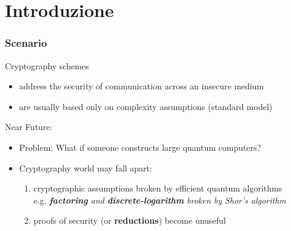 \section{Introduzione}

\begin{frame}
 \frametitle{Scenario}
 \begin{center}
 \end{center}

 \begin{block}{Cryptography schemes}
 \begin{itemize}
  \item address the security of communication across an insecure medium
  \item are usually based only on complexity assumptions (standard model)
 \end{itemize}
 \end{block}
 
 \begin{block}{Near Future:}
 \begin{itemize}
    \item \alert{Problem:} What if someone constructs large quantum computers?
    \item Cryptography world may fall apart:
    \begin{enumerate}
     \item<4-> cryptographic assumptions broken by efficient quantum algorithms \\
	  e.g. \emph{\textbf{factoring} and \textbf{discrete-logarithm} broken by Shor's algorithm}
     \item<5-> proofs of security (or \textbf{reductions}) become unuseful 
    \end{enumerate}
 \end{itemize}
\end{block}

\end{frame}

